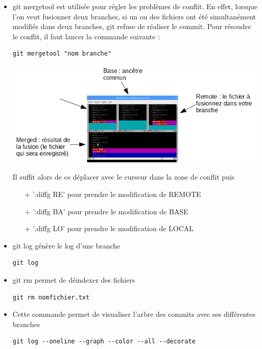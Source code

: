 \documentclass[french, 12pt]{article}%
\newcommand{\itemE}{\item[$\bullet$]}
\begin{document}
\begin{itemize}
\itemE git mergetool est utilisée pour régler les problèmes de conflit. En effet, lorsque l'on veut fusionner deux branches, si un ou des fichiers ont été simultanément modifiés dans deux branches, git refuse de réaliser le commit.  Pour résoudre le conflit, il faut lancer la commande suivante :
\begin{lstlisting}[style=commande]
git mergetool "nom branche"
\end{lstlisting}

\begin{center}
\includegraphics[scale=0.7]{./ressource/merge_tool.png}
\end{center}

Il suffit alors de ce déplacer avec le curseur dans la zone de conflit puis
\begin{itemize}
\item[+] ':diffg RE' pour prendre le modification de REMOTE
\item[+] ':diffg BA' pour prendre le modification de BASE
\item[+] ':diffg LO' pour prendre le modification de LOCAL
\end{itemize}

\itemE  git log génère le log d’une branche
\begin{lstlisting}[style=commande]
git log
\end{lstlisting}

\itemE  git rm permet de déindexer des fichiers
\begin{lstlisting}[style=commande]
git rm nomfichier.txt
\end{lstlisting}


\itemE Cette commande permet de visualiser l'arbre des commits avec ses différentes branches	
\begin{lstlisting}[style=commande]
git log --oneline --graph --color --all --decorate
\end{lstlisting}


\end{itemize}
\end{document}
